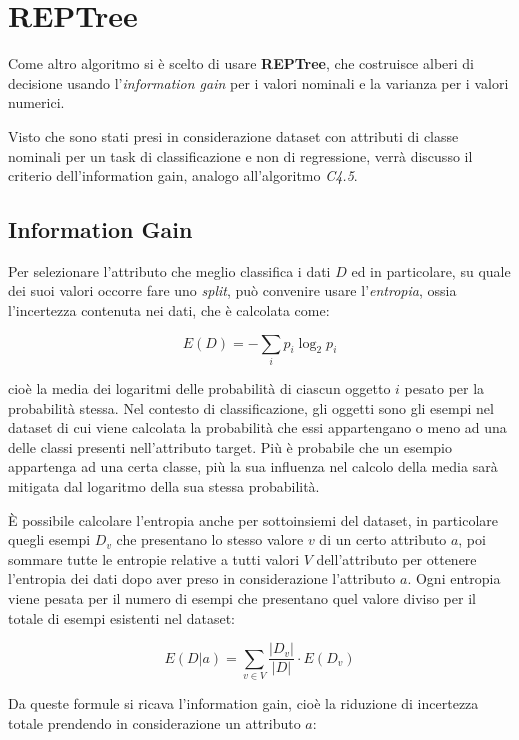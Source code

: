 \chapter{REPTree}
\label{ch:reptree}

Come altro algoritmo si è scelto di usare \textbf{REPTree}, che costruisce alberi di decisione usando l'\textit{information gain} per i valori nominali e la varianza per i valori numerici\cite{2Witten:2011:DMP:REPTree}.

Visto che sono stati presi in considerazione dataset con attributi di classe nominali per un task di classificazione e non di regressione, verrà discusso il criterio dell'information gain, analogo all'algoritmo \textit{C4.5}\cite{Quinlan:1993:CPM:152181}.

\section{Information Gain}
Per selezionare l'attributo che meglio classifica i dati $D$ ed in particolare, su quale dei suoi valori occorre fare uno \textit{split}, può convenire usare l'\emph{entropia}\cite{Shannon:1948}, ossia l'incertezza contenuta nei dati, che è calcolata come:

$$ E(D) = - \sum_{i} p_i \log_2 p_i $$

cioè la media dei logaritmi delle probabilità di ciascun oggetto $i$ pesato per la probabilità stessa. Nel contesto di classificazione, gli oggetti sono gli esempi nel dataset di cui viene calcolata la probabilità che essi appartengano o meno ad una delle classi presenti nell'attributo target. Più è probabile che un esempio appartenga ad una certa classe, più la sua influenza nel calcolo della media sarà mitigata dal logaritmo della sua stessa probabilità.

È possibile calcolare l'entropia anche per sottoinsiemi del dataset, in particolare quegli esempi $D_v$ che presentano lo stesso valore $v$ di un certo attributo $a$, poi sommare tutte le entropie relative a tutti valori $V$ dell'attributo per ottenere l'entropia dei dati dopo aver preso in considerazione l'attributo $a$.
Ogni entropia viene pesata per il numero di esempi che presentano quel valore diviso per il totale di esempi esistenti nel dataset:

$$ E(D|a) = \sum_{v \in V} \frac{|D_v|}{|D|} \cdot E(D_v) $$

Da queste formule si ricava l'information gain, cioè la riduzione di incertezza totale prendendo in considerazione un attributo $a$:

